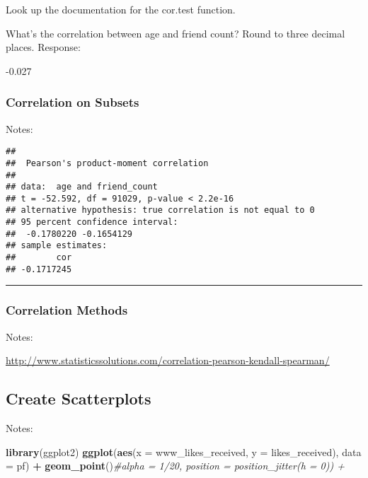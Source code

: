 \documentclass[]{article}
\newenvironment{Shaded}{\begin{snugshade}}{\end{snugshade}}
\newcommand{\KeywordTok}[1]{\textcolor[rgb]{0.13,0.29,0.53}{\textbf{#1}}}
\newcommand{\DataTypeTok}[1]{\textcolor[rgb]{0.13,0.29,0.53}{#1}}
\newcommand{\DecValTok}[1]{\textcolor[rgb]{0.00,0.00,0.81}{#1}}
\newcommand{\StringTok}[1]{\textcolor[rgb]{0.31,0.60,0.02}{#1}}
\newcommand{\CommentTok}[1]{\textcolor[rgb]{0.56,0.35,0.01}{\textit{#1}}}
\newcommand{\OperatorTok}[1]{\textcolor[rgb]{0.81,0.36,0.00}{\textbf{#1}}}
\newcommand{\NormalTok}[1]{#1}
\begin{document}
Look up the documentation for the cor.test function.

What's the correlation between age and friend count? Round to three
decimal places. Response:

-0.027

\subsubsection{Correlation on Subsets}\label{correlation-on-subsets}

Notes:

\begin{Shaded}
\end{Shaded}

\begin{verbatim}
## 
##  Pearson's product-moment correlation
## 
## data:  age and friend_count
## t = -52.592, df = 91029, p-value < 2.2e-16
## alternative hypothesis: true correlation is not equal to 0
## 95 percent confidence interval:
##  -0.1780220 -0.1654129
## sample estimates:
##        cor 
## -0.1717245
\end{verbatim}

\begin{center}\rule{0.5\linewidth}{\linethickness}\end{center}

\subsubsection{Correlation Methods}\label{correlation-methods}

Notes:

\url{http://www.statisticssolutions.com/correlation-pearson-kendall-spearman/}

\subsection{Create Scatterplots}\label{create-scatterplots}

Notes:

\begin{Shaded}
\begin{Highlighting}[]
\KeywordTok{library}\NormalTok{(ggplot2)}
\KeywordTok{ggplot}\NormalTok{(}\KeywordTok{aes}\NormalTok{(}\DataTypeTok{x =}\NormalTok{ www_likes_received, }\DataTypeTok{y =}\NormalTok{ likes_received), }\DataTypeTok{data =}\NormalTok{ pf) }\OperatorTok{+}
\StringTok{  }\KeywordTok{geom_point}\NormalTok{()}\CommentTok{#alpha = 1/20, position = position_jitter(h = 0)) +}
\end{Highlighting}
\end{Shaded}
\end{document}
